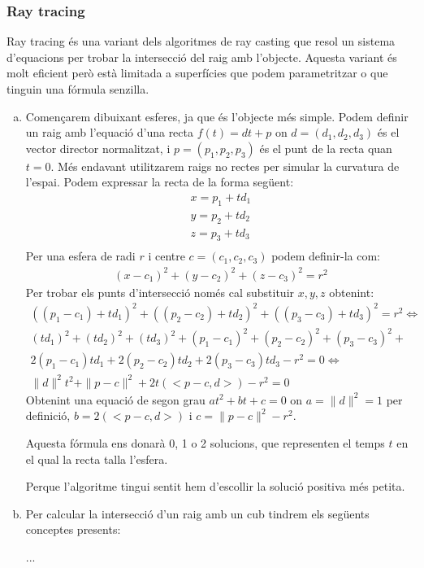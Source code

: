 \documentclass{article}
\begin{document}
\subsubsection{Ray tracing}
Ray tracing és una variant dels algoritmes de ray casting que resol un sistema d'equacions per trobar la intersecció del raig amb
l'objecte. Aquesta variant és molt eficient però està limitada a superfícies que podem parametritzar o que tinguin una fórmula
senzilla.
\begin{enumerate}[a)]
   \item Començarem dibuixant esferes, ja que és l'objecte més simple.
  Podem definir un raig amb l'equació d'una recta $f(t)=dt+p$ on $d=(d_1,d_2,d_3)$ és el vector director normalitzat, i $p=(p_1,p_2,p_3)$ és
  el punt de la recta quan $t=0$. 
  Més endavant utilitzarem raigs no rectes per simular la curvatura de l'espai.
  Podem expressar la recta de la forma següent:
\begin{align*}
x=p_1+td_1 \\
y=p_2+td_2 \\
z=p_3+td_3 \\
\end{align*}
Per una esfera de radi $r$ i centre  $c=(c_1,c_2,c_3)$ podem definir-la com:
\begin{align*}
   (x-c_1)^2+(y-c_2)^2 +(z-c_3)^2 =r^2
\end{align*}
Per trobar els punts d'intersecció només cal substituir $x,y,z$ obtenint:
 \begin{align*}
   ((p_1-c_1)+td_1)^2 + ((p_2-c_2)+td_2)^2+((p_3-c_3)+td_3)^2= r^2  \iff \\
   (td_1)^2+(td_2)^2+(td_3)^2+ (p_1-c_1)^2+(p_2-c_2)^2+(p_3-c_3)^2+\\ 2(p_1-c_1)td_1+2(p_2-c_2)td_2+2(p_3-c_3)td_3 -r^2=0  \iff\\
   \|d\|^2t^2 + \|p-c\|^2+2t(<p-c,d>) -r^2=0
\end{align*}
Obtenint una equació de segon grau $at^2+bt+c=0$ on $a= \|d\|^2 =1$ per definició, $b=2(<p-c,d>)$ i  $c=\|p-c\|^2-r^2$. 

Aquesta fórmula ens donarà 0, 1 o 2 solucions, que representen el temps $t$ en el qual la recta talla l'esfera.

Perque l'algoritme tingui sentit hem d'escollir la solució positiva més petita.
\item Per calcular la intersecció d'un raig amb un cub tindrem els següents conceptes presents:


   ...
\end{enumerate}
\end{document}
